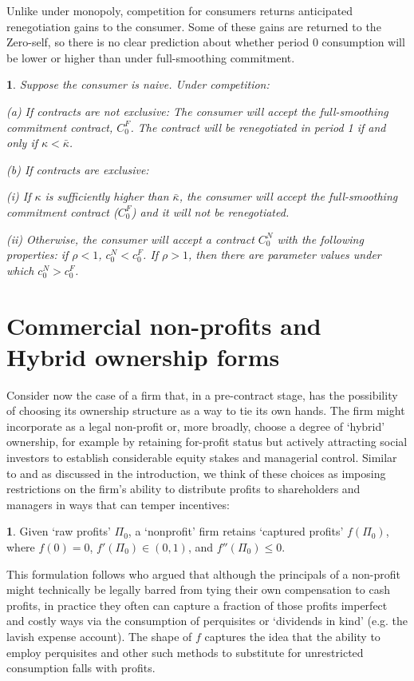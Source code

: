 \documentclass[11pt,english]{article}
\theoremstyle{plain}
\newtheorem{prop}{\protect\propositionname}
\theoremstyle{definition}
\newtheorem*{defn*}{\protect\definitionname}
\providecommand{\definitionname}{Definition}
\providecommand{\propositionname}{Proposition}
\begin{document}
Unlike under monopoly, competition for consumers returns anticipated renegotiation
gains to the consumer. Some of these gains are returned to the Zero-self,
so there is no clear prediction about whether period 0 consumption
will be lower or higher than under full-smoothing commitment. 
\begin{prop}
Suppose the consumer is naive. Under competition:

(a) If contracts are not exclusive: The consumer will accept the full-smoothing
commitment contract, $C_{0}^{F}$. The contract will be renegotiated
in period 1 if and only if $\kappa<\bar{\kappa}$.

(b) If contracts are exclusive: 

\begin{enumerate}
(i) If $\kappa$ is sufficiently higher than $\bar{\kappa}$, the
consumer will accept the full-smoothing commitment contract ($C_{0}^{F}$)
and it will not be renegotiated.

(ii) Otherwise, the consumer will accept a contract $C_{0}^{N}$ with
the following properties: if $\rho<1$, $c_{0}^{N}<c_{0}^{F}$. If
$\rho>1$, then there are parameter values under which $c_{0}^{N}>c_{0}^{F}$. \end{enumerate}
\end{prop}

\section{Commercial non-profits and Hybrid ownership forms}

\label{nonprofits}

Consider now the case of a firm that, in a pre-contract stage, has
the possibility of choosing its ownership structure as a way to tie its own hands. The firm might incorporate
as a legal non-profit or, more broadly, choose a degree of `hybrid'
ownership, for example by retaining for-profit status but actively attracting
social investors to establish considerable equity stakes and managerial
control. Similar to \citet{hansmann1996a} and as discussed
in the introduction, we think of these choices as imposing  restrictions on the firm's
ability to distribute profits to shareholders and managers in ways that can temper incentives: 
\begin{defn*}
Given `raw profits' $\Pi_{0}$, a `nonprofit' firm retains `captured
profits' $f\left(\Pi_{0}\right)$, where $f\left(0\right)=0$, $f'\left(\Pi_{0}\right)\in\left(0,1\right)$,
and $f''\left(\Pi_{0}\right)\leq0.$ 
\end{defn*}
This formulation follows \citet{glaeser2001} who argued that although
the principals of a non-profit might technically be legally barred from
tying their own compensation to cash profits, in practice they often can capture a
fraction of those profits  imperfect and costly ways via the consumption
of perquisites or `dividends in kind' (e.g. the lavish expense account).
The shape of \(f\) captures the idea that the ability to employ perquisites and other such methods to substitute for unrestricted consumption
falls with profits.
\end{document}
